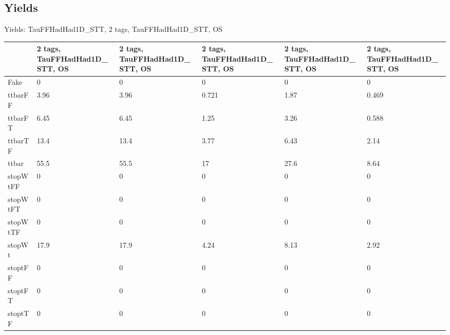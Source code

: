 
\subsection{Yields}

\begin{frame}{Yields: TauFFHadHad1D\_STT, 2 tags, TauFFHadHad1D\_STT, OS}
\begin{center}
  \begin{tabular}{l| >{\centering\let\newline\\\arraybackslash\hspace{0pt}}m{1.4cm}| >{\centering\let\newline\\\arraybackslash\hspace{0pt}}m{1.4cm}| >{\centering\let\newline\\\arraybackslash\hspace{0pt}}m{1.4cm}| >{\centering\let\newline\\\arraybackslash\hspace{0pt}}m{1.4cm}| >{\centering\let\newline\\\arraybackslash\hspace{0pt}}m{1.4cm}}
    & 2 tags, TauFFHadHad1D\_STT, OS & 2 tags, TauFFHadHad1D\_STT, OS & 2 tags, TauFFHadHad1D\_STT, OS & 2 tags, TauFFHadHad1D\_STT, OS & 2 tags, TauFFHadHad1D\_STT, OS \\
 \hline \hline
    Fake& 0 & 0 & 0 & 0 & 0 \\
 \hline
    ttbarFF& 3.96 & 3.96 & 0.721 & 1.87 & 0.469 \\
 \hline
    ttbarFT& 6.45 & 6.45 & 1.25 & 3.26 & 0.588 \\
 \hline
    ttbarTF& 13.4 & 13.4 & 3.77 & 6.43 & 2.14 \\
 \hline
    ttbar& 55.5 & 55.5 & 17 & 27.6 & 8.64 \\
 \hline
    stopWtFF& 0 & 0 & 0 & 0 & 0 \\
 \hline
    stopWtFT& 0 & 0 & 0 & 0 & 0 \\
 \hline
    stopWtTF& 0 & 0 & 0 & 0 & 0 \\
 \hline
    stopWt& 17.9 & 17.9 & 4.24 & 8.13 & 2.92 \\
 \hline
    stoptFF& 0 & 0 & 0 & 0 & 0 \\
 \hline
    stoptFT& 0 & 0 & 0 & 0 & 0 \\
 \hline
    stoptTF& 0 & 0 & 0 & 0 & 0 \\

\end{tabular}
\end{center}
\end{frame}
